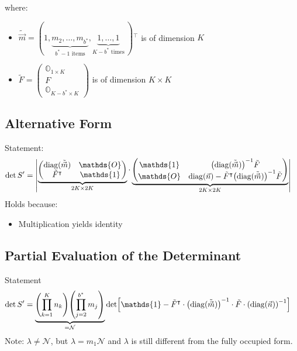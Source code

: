 \documentclass[
	english,
	a4paper,
	fontsize=10pt,
	parskip=half,
	titlepage=true,
	DIV=12,
	final
]{scrreprt}
\newcommand*{\transp}{\ensuremath{^\intercal}}
\DeclareMathOperator{\diag}{diag}
\begin{document}
where:
\begin{itemize}
\item $\tilde{\vec{m}} = (
	1,
	\underbrace{m_2, \ldots, m_{b^*}}_{b^* -1 \text{ items}},
	\underbrace{1, \ldots, 1}_{K - b^* \text{ times}}
	~)\transp$ is of dimension $K$
\item $\tilde{F} = \begin{pmatrix}
		\mathds{O}_{1 \times K} \\ 
		F \\ 
		\mathds{O}_{K - b^* \times K}
	\end{pmatrix}$
	is of dimension $K \times K$
\end{itemize}

\subsection{Alternative Form}
Statement:
\begin{align}
	\det S'
&=
	\mqty|
		\underbrace{\begin{pmatrix}
			\diag(\tilde{\vec{m}})	& \mathds{O}			\\
			\tilde{F}\transp			& \mathds{1}
		\end{pmatrix}}_{2K \times 2K}
		\cdot
		\underbrace{\begin{pmatrix}
			\mathds{1}	&	\qty(\diag(\tilde{\vec{m}}))^{-1} \tilde{F}		\\
			\mathds{O}	&	\diag(\vec{n}) - \tilde{F}\transp \qty(\diag(\tilde{\vec{m}}))^{-1}\tilde{F}
		\end{pmatrix}}_{2K \times 2K}
	|
	\label{eqn:detSPrime_m}
\end{align}
Holds because:
\begin{itemize}
\item Multiplication yields identity
\end{itemize}

\subsection{Partial Evaluation of the Determinant}
Statement
\begin{align}
	\det S'
&=
	\underbrace{
		\qty( \prod_{k=1}^{K}   n_k )
		\qty( \prod_{j=2}^{b^*} m_j )
	}_{= \mathcal{N} }
	\det[
		\mathds{1} -
		\tilde{F}\transp \cdot \qty( \diag(\tilde{\vec{m}}) )^{-1}
		\cdot
		\tilde{F} \cdot \qty( \diag(\vec{n}) )^{-1}
	]
\label{eqn:detSPrimePartial}
\end{align}
Note: $\lambda \neq \mathcal{N}$, but $\lambda = m_1 \mathcal{N}$ {\color{red} and $\lambda$ is still different from the fully occupied form}.
\end{document}
